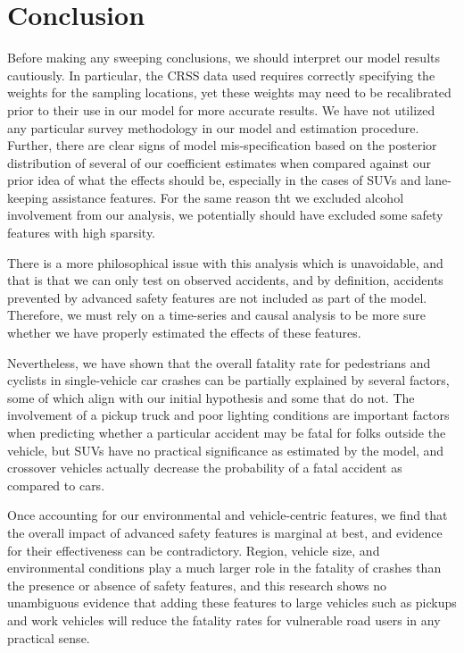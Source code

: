 \documentclass[12pt]{article}
\begin{document}
\section{Conclusion}

Before making any sweeping conclusions, we should interpret our model results cautiously. In particular, the CRSS
data used requires correctly specifying the weights for the sampling locations, yet these weights may need to be
recalibrated prior to their use in our model for more accurate results. We have not utilized any particular
survey methodology in our model and estimation procedure. Further, there are clear signs of model mis-specification
based on the posterior distribution of several of our coefficient estimates when compared against our prior idea of what
the effects should be, especially in the cases of SUVs and lane-keeping assistance features. For the same reason tht we
excluded alcohol involvement from our analysis, we potentially should have excluded some safety features with high 
sparsity.

There is a more philosophical issue with this analysis which is unavoidable, and that is that we can only test on 
observed accidents, and by definition, accidents prevented by advanced safety features are not included
as part of the model. Therefore, we must rely on a time-series and causal analysis to be more
sure whether we have properly estimated the effects of these features.

Nevertheless, we have shown that the overall fatality rate for pedestrians and cyclists in single-vehicle car
crashes can be partially explained by several factors, some of which align with our initial hypothesis and
some that do not. The involvement of a pickup truck and poor lighting conditions are important factors
when predicting whether a particular accident may be fatal for folks outside the vehicle, but SUVs have no practical
significance as estimated by the model, and crossover vehicles actually decrease the probability of a fatal accident
as compared to cars.

Once accounting for our environmental and vehicle-centric features, we find that the overall impact
of advanced safety features is marginal at best, and evidence for their effectiveness
can be contradictory. Region, vehicle size, and environmental conditions play a much
larger role in the fatality of crashes than the presence or absence of safety features, and this research
shows no unambiguous evidence that adding these features to large vehicles such as pickups
and work vehicles will reduce the fatality rates for vulnerable road users in any practical sense.
\end{document}
